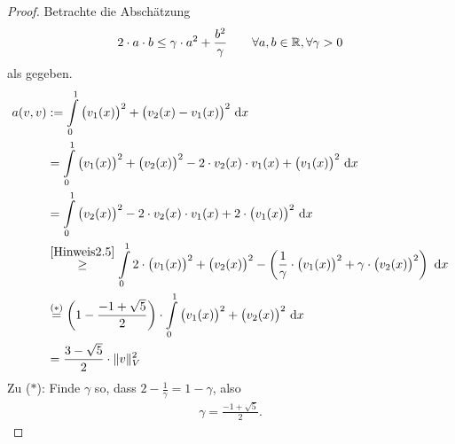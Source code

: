 \documentclass[12pt,a4paper]{article}
\begin{document}
\begin{proof}
Betrachte die Abschätzung
\begin{align}\label{Hinweis2.5}
2\cdot a\cdot b\leq\gamma\cdot a^2+\frac{b^2}{\gamma}\qquad\forall a,b\in\mathbb{R},\forall\gamma>0
\end{align}
als gegeben.
\begin{align*}
a(v,v)&:=\int\limits_0^1 \big(v_1(x)\big)^2+\big(v_2(x)-v_1(x)\big)^2\text{ d} x\\
&=\int\limits_0^1 \big(v_1(x)\big)^2+\big(v_2(x)\big)^2-2\cdot v_2(x)\cdot v_1(x)+\big(v_1(x)\big)^2\text{ d} x\\
&=\int\limits_0^1 \big(v_2(x)\big)^2-2\cdot v_2(x)\cdot v_1(x)+2\cdot\big(v_1(x)\big)^2\text{ d} x\\
&\stackrel{\eqref{Hinweis2.5}}{\geq}
\int\limits_0^1 2\cdot\big(v_1(x)\big)^2+\big(v_2(x)\big)^2-\left(\frac{1}{\gamma}\cdot\big(v_1(x)\big)^2+\gamma\cdot\big(v_2(x)\big)^2\right)\text{ d} x\\
&\stackrel{(\ast)}{=}
\left(1-\frac{-1+\sqrt{5}}{2}\right)\cdot\int\limits_0^1 \big(v_1(x)\big)^2+\big(v_2(x)\big)^2\text{ d} x\\
&=\frac{3-\sqrt{5}}{2}\cdot\Vert v\Vert^2_V
\end{align*}
Zu ($\ast$): Finde $\gamma$ so, dass $2-\frac{1}{\gamma}=1-\gamma$, also
\begin{align*}
\gamma=\frac{-1+\sqrt{5}}{2}.
\end{align*}
\end{proof}
\end{document}
